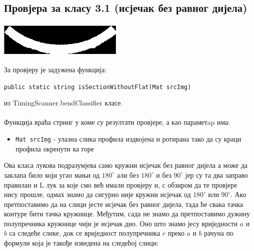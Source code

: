 \documentclass[12pt]{article}
\begin{document}
\subsection{Провјера за класу 3.1 (исјечак без равног дијела)}
\vspace{0.5cm}
\begin{center}
    \centering 
    \includegraphics[height=1.7cm, width=6cm]{images/8_correct_rotation.png}
\end{center}
\vspace{0.5cm}
За провјеру је задужена функција:
\begin{center}
\texttt{public static string isSectionWithoutFlat(Mat srcImg)}
\end{center}
из TimingScanner.bendClassifier класе.\\\\
Функција враћа стринг у коме су резултати провјере, а као параметap има:
\begin{itemize}
    \item \texttt{Mat srcImg} - улазна слика профила издвојена и ротирана тако да су краци профила окренути ка горе 
\end{itemize}
Ова класа лукова подразумјева само кружни исјечак без равног дијела а може да заклапа било који угао мањи од $180^\circ$ али без $180^\circ$ и без $90^\circ$ јер су та два заправо правилан и L лук за које смо већ имали провјеру и, с обзиром да те провјере нису прошле, одмах знамо да сигурно није кружни исјечак од $180^\circ$ или $90^\circ$. Ако претпоставимо да на слици јесте исјечак без равног дијела, тада ће свака тачка контуре бити тачка кружнице. Међутим, сада не знамо да претпоставимо дужину полупречника кружнице чији је исјечак дио. Оно што знамо јесу вриједности $a$ и $b$ са следеће слике, док се вриједност полупречника $r$ преко $a$ и $b$ рачуна по формули која је такође изведена на следећој слици:
\vspace{0.5cm}
\end{document}
